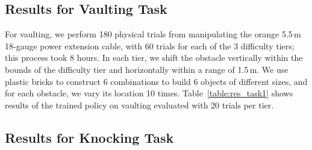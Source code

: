 
\subsection{Results for Vaulting Task}
For vaulting, we perform 180 physical trials from manipulating the orange 5.5\,m 18-gauge power extension cable, with 60 trials for each of the 3 difficulty tiers; this process took 8 hours. In each tier, we shift the obstacle vertically within the bounds of the difficulty tier and horizontally within a range of 1.5\,m. We use plastic bricks to construct 6 combinations to build 6 objects of different sizes, and for each obstacle, we vary its location 10 times. Table~\ref{table:res_task1} shows results of the trained policy on vaulting evaluated with 20 trials per tier.




\subsection{Results for Knocking Task}

